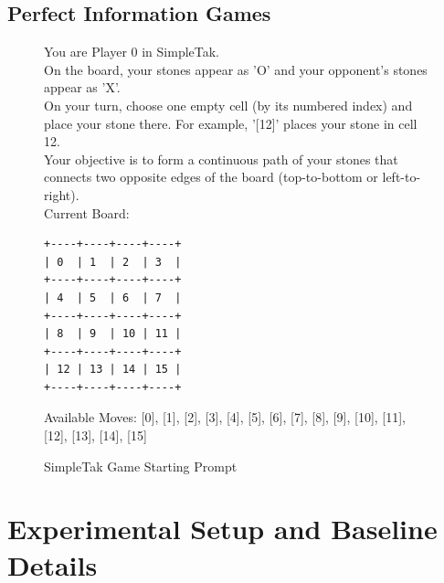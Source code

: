 \subsection{Perfect Information Games}


\begin{figure}[H]
\centering

\begin{tcolorbox}[
    colback=blue!5!white,
    colframe=blue!40!white,
    left=0.8mm, right=0.8mm, top=0.8mm, bottom=0.8mm,
    boxsep=0.8mm,
    width=\textwidth,
    enhanced,
    breakable,
    attach boxed title to top center={yshift=-2mm},
    boxed title style={colback=blue!40!white},
    title={SimpleTak Game Starting Prompt},
    fontupper=\footnotesize,
    fonttitle=\footnotesize,
    label=box:SimpleTak
]
You are Player 0 in SimpleTak.\\
On the board, your stones appear as 'O' and your opponent's stones appear as 'X'.\\

On your turn, choose one empty cell (by its numbered index) and place your stone there.
For example, '[12]' places your stone in cell 12.\\

Your objective is to form a continuous path of your stones that connects two opposite edges of the board (top-to-bottom or left-to-right).\\


Current Board:\\

\begin{verbatim}
+----+----+----+----+
| 0  | 1  | 2  | 3  |
+----+----+----+----+
| 4  | 5  | 6  | 7  |
+----+----+----+----+
| 8  | 9  | 10 | 11 |
+----+----+----+----+
| 12 | 13 | 14 | 15 |
+----+----+----+----+
\end{verbatim}
Available Moves: [0], [1], [2], [3], [4], [5], [6], [7], [8], [9], [10], [11], [12], [13], [14], [15]\\
\end{tcolorbox}

\caption{SimpleTak Game Starting Prompt} \label{box:SimpleTak}
\end{figure}

\section{Experimental Setup and Baseline Details}
\label{appendix: Training_settings}

